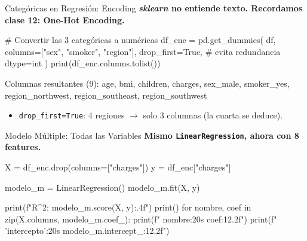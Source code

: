 \documentclass[aspectratio=169, 11pt]{beamer}
\begin{document}
\begin{frame}[fragile,shrink=33]{Categóricas en Regresión: Encoding}
  \vspace{-6pt}
  {\footnotesize\color{arcaDark}\bfseries
    \textit{sklearn} no entiende texto. Recordamos clase 12: One-Hot Encoding.}

  \vspace{4pt}
  \begin{pyblock}
# Convertir las 3 categóricas a numéricas
df_enc = pd.get_dummies(
    df,
    columns=["sex", "smoker", "region"],
    drop_first=True,   # evita redundancia
    dtype=int
)
print(df_enc.columns.tolist())
  \end{pyblock}

  \vspace{4pt}
  \begin{outputblock}
Columnas resultantes (9):
  age, bmi, children, charges,
  sex_male, smoker_yes,
  region_northwest, region_southeast, region_southwest
  \end{outputblock}

  \vspace{4pt}
  {\scriptsize\color{textMuted}
  \begin{itemize}\setlength{\itemsep}{3pt}
    \item[{\color{arcaRed}\scriptsize\faArrowRight}]
      \texttt{drop\_first=True}: 4 regiones $\to$ solo 3 columnas (la cuarta se deduce).
  \end{itemize}
  }
\end{frame}

\begin{frame}[fragile,shrink=28]{Modelo Múltiple: Todas las Variables}
  \vspace{-6pt}
  {\footnotesize\color{arcaDark}\bfseries
    Mismo \texttt{LinearRegression}, ahora con \textbf{8 features}.}

  \vspace{4pt}
  \begin{pyblock}
X = df_enc.drop(columns=["charges"])
y = df_enc["charges"]

modelo_m = LinearRegression()
modelo_m.fit(X, y)

print(f"R^2: {modelo_m.score(X, y):.4f}")
print()
for nombre, coef in zip(X.columns, modelo_m.coef_):
    print(f"  {nombre:20s} {coef:12.2f}")
print(f"  {'intercepto':20s} {modelo_m.intercept_:12.2f}")
  \end{pyblock}
\end{frame}
\end{document}
